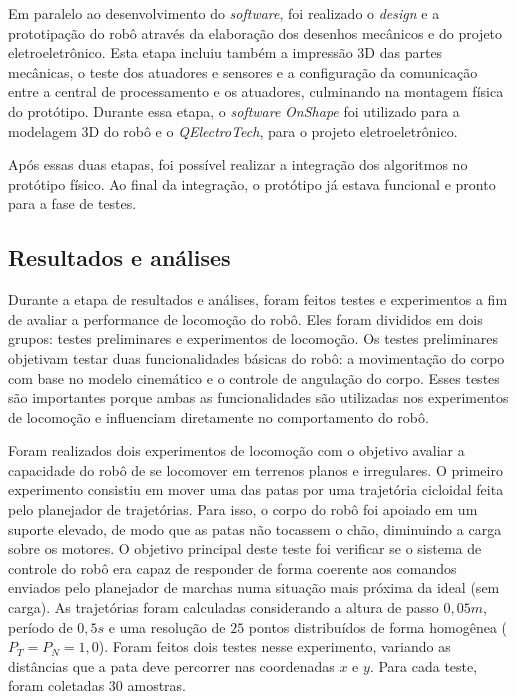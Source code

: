 \documentclass[../main.tex]{subfiles}
\begin{document}
  Em paralelo ao desenvolvimento do \textit{software}, foi realizado o \textit{design} e a prototipação do robô através da elaboração dos desenhos mecânicos e do projeto eletroeletrônico. Esta etapa incluiu também a impressão 3D das partes mecânicas, o teste dos atuadores e sensores e a configuração da comunicação entre a central de processamento e os atuadores, culminando na montagem física do protótipo. Durante essa etapa, o \textit{software} \textit{OnShape} foi utilizado para a modelagem 3D do robô e o \textit{QElectroTech}, para o projeto eletroeletrônico.

  Após essas duas etapas, foi possível realizar a integração dos algoritmos no protótipo físico. Ao final da integração, o protótipo já estava funcional e pronto para a fase de testes.

  \subsection{Resultados e análises}
  \label{sec:method_results_analysis}
  Durante a etapa de resultados e análises, foram feitos testes e experimentos a fim de avaliar a performance de locomoção do robô. Eles foram divididos em dois grupos: testes preliminares e experimentos de locomoção. Os testes preliminares objetivam testar duas funcionalidades básicas do robô: a movimentação do corpo com base no modelo cinemático e o controle de angulação do corpo. Esses testes são importantes porque ambas as funcionalidades são utilizadas nos experimentos de locomoção e influenciam diretamente no comportamento do robô.
  
  Foram realizados dois experimentos de locomoção com o objetivo avaliar a capacidade do robô de se locomover em terrenos planos e irregulares. O primeiro experimento consistiu em mover uma das patas por uma trajetória cicloidal feita pelo planejador de trajetórias. Para isso, o corpo do robô foi apoiado em um suporte elevado, de modo que as patas não tocassem o chão, diminuindo a carga sobre os motores. O objetivo principal deste teste foi verificar se o sistema de controle do robô era capaz de responder de forma coerente aos comandos enviados pelo planejador de marchas numa situação mais próxima da ideal (sem carga). As trajetórias foram calculadas considerando a altura de passo $0,05 m$, período de $0,5 s$ e uma resolução de $25$ pontos distribuídos de forma homogênea ($P_T = P_N = 1,0$). Foram feitos dois testes nesse experimento, variando as distâncias que a pata deve percorrer nas coordenadas $x$ e $y$. Para cada teste, foram coletadas 30 amostras.
  
\end{document}
